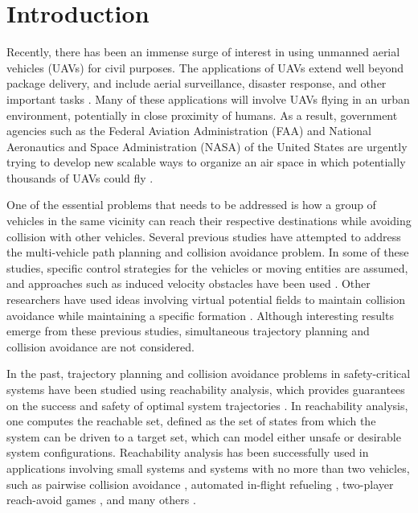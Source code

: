 \section{Introduction}
Recently, there has been an immense surge of interest in using unmanned aerial vehicles (UAVs) for civil purposes. The applications of UAVs extend well beyond package delivery, and include aerial surveillance, disaster response, and other important tasks \cite{Tice91, Debusk10, Amazon16, AUVSI16, BBC16}. Many of these applications will involve UAVs flying in an urban environment, potentially in close proximity of humans. As a result, government agencies such as the Federal Aviation Administration (FAA) and National Aeronautics and Space Administration (NASA) of the United States are urgently trying to develop new scalable ways to organize an air space in which potentially thousands of UAVs could fly \cite{FAA13, NASA16}.

One of the essential problems that needs to be addressed is how a group of vehicles in the same vicinity can reach their respective destinations while avoiding collision with other vehicles. Several previous studies have attempted to address the multi-vehicle path planning and collision avoidance problem. In some of these studies, specific control strategies for the vehicles or moving entities are assumed, and approaches such as induced velocity obstacles have been used \cite{Fiorini98, Chasparis05, Vandenberg08}.  Other researchers have used ideas involving virtual potential fields to maintain collision avoidance while maintaining a specific formation \cite{Saber02, Chuang07}. Although interesting results emerge from these previous studies, simultaneous trajectory planning and collision avoidance are not considered. 

In the past, trajectory planning and collision avoidance problems in safety-critical systems have been studied using reachability analysis, which provides guarantees on the success and safety of optimal system trajectories \cite{Barron90, Mitchell05, Bokanowski10, Margellos11, Fisac15}. In reachability analysis, one computes the reachable set, defined as the set of states from which the system can be driven to a target set, which can model either unsafe or desirable system configurations. Reachability analysis has been successfully used in applications involving small systems and systems with no more than two vehicles, such as pairwise collision avoidance \cite{Mitchell05}, automated in-flight refueling \cite{Ding08}, two-player reach-avoid games \cite{Huang11}, and many others \cite{Bayen07}.

